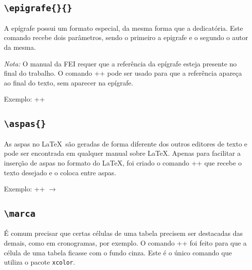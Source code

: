 \documentclass{fei}
\begin{document}
    \subsection{\texttt{\textbackslash epigrafe\{\}\{\}}}
    A epígrafe possui um formato especial, da mesma forma que a dedicatória. Este comando recebe dois parâmetros, sendo o primeiro a epigrafe e o segundo o autor da mesma.
    
    \emph{Nota:} O manual da FEI requer que a referência da epígrafe esteja presente no final do trabalho. O comando \latexinline+\nocite{obra}+ pode ser usado para que a referência apareça ao final do texto, sem aparecer na epígrafe.
    
    Exemplo: \latexinline++
    
    \subsection{\texttt{\textbackslash aspas\{\}}}
    As aspas no \LaTeX\ são geradas de forma diferente dos outros editores de texto e pode ser encontrada em qualquer manual sobre \LaTeX. Apenas para facilitar a inserção de aspas no formato do \LaTeX, foi criado o comando \latexinline+\aspas{}+ que recebe o texto desejado e o coloca entre aspas.

    Exemplo: \latexinline++ $\to$ 
    
    \subsection{\texttt{\textbackslash marca}}
    É comum precisar que certas células de uma tabela precisem ser destacadas das demais, como em cronogramas, por exemplo. O comando \latexinline+\marca+ foi feito para que a célula de uma tabela ficasse com o fundo cinza. Este é o único comando que utiliza o pacote \texttt{xcolor}.
\end{document}
